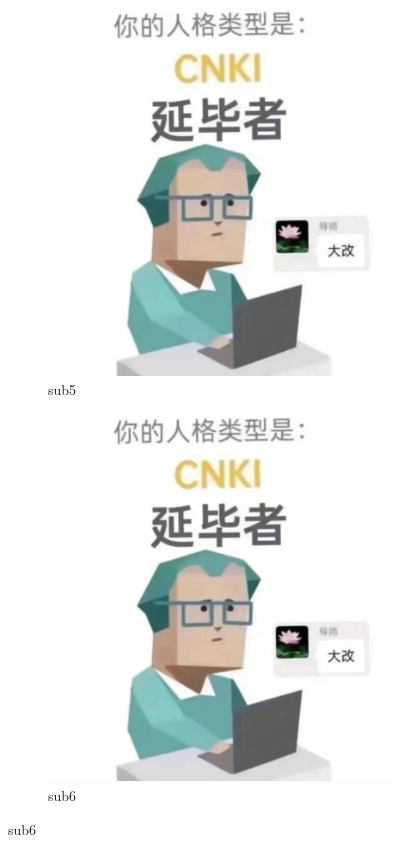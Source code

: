 \begin{figure}[!ht]\ContinuedFloat \centering
	\begin{subfigure}[b]{0.49\textwidth}\centering
		\includegraphics[width=\textwidth]{./Graphs/example/example.jpeg}
		\caption{sub5}\label{subf::sub5}
	\end{subfigure}\hfill %
	\begin{subfigure}[b]{0.49\textwidth}\centering
		\includegraphics[width=\textwidth]{./Graphs/example/example.jpeg}
		\caption{sub6}\label{subf::sub6}
	\end{subfigure}
\end{figure}
